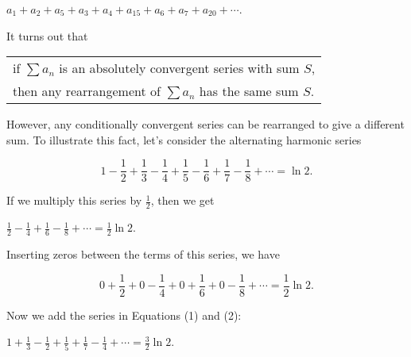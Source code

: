\documentclass[paper=a4, fontsize=11pt]{scrartcl} %
\numberwithin{equation}{section} %
\numberwithin{figure}{section} %
\numberwithin{table}{section} %
\newcommand{\ds}{\displaystyle}
\newcommand{\sk}{\noalign{\smallskip}}
\newcommand{\senter}{\vspace{3mm}}
\begin{document}
\senter

\begin{center}
$a_1+a_2+a_5+a_3+a_4+a_{15}+a_6+a_7+a_{20}+\cdots$.
\end{center}

\senter

\noindent It turns out that

\senter

\begin{center}
\begin{tabular}{ l }
if $\ds\sum a_n$ is an absolutely convergent series with sum $S$, \\
\sk
then any rearrangement of $\ds\sum a_n$ has the same sum $S$.
\end{tabular}
\end{center}

\senter

\noindent However, any conditionally convergent series can be rearranged to give a different sum. To illustrate this fact, let's consider the alternating harmonic series

\begin{equation}
1-\frac{1}{2}+\frac{1}{3}-\frac{1}{4}+\frac{1}{5}-\frac{1}{6}+\frac{1}{7}-\frac{1}{8}+\cdots=\ln2.
\end{equation}

\senter

\noindent If we multiply this series by $\ds\frac{1}{2}$, then we get

\begin{center}
$\ds\frac{1}{2}-\frac{1}{4}+\frac{1}{6}-\frac{1}{8}+\cdots=\frac{1}{2}\ln2$.
\end{center}

\senter

\noindent Inserting zeros between the terms of this series, we have

\begin{equation}
0+\frac{1}{2}+0-\frac{1}{4}+0+\frac{1}{6}+0-\frac{1}{8}+\cdots=\frac{1}{2}\ln2.
\end{equation}

\senter

\noindent Now we add the series in Equations (1) and (2):

\senter

\begin{center}
$\ds1+\frac{1}{3}-\frac{1}{2}+\frac{1}{5}+\frac{1}{7}-\frac{1}{4}+\cdots=\frac{3}{2}\ln2$.
\end{center}

\senter
\end{document}
